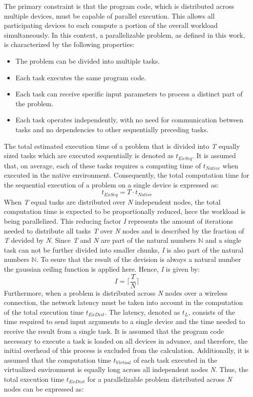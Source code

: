 The primary constraint is that the program code, which is distributed across multiple devices, must be capable of parallel execution. This allows all participating devices to  each compute a portion of the overall workload simultaneously. In this context, a parallelizable problem, as defined in this work, is characterized by the following properties:
\begin{itemize}
  \item The problem can be divided into multiple tasks.
  \item Each task executes the same program code.
  \item Each task can receive specific input parameters to process a distinct part of the problem.
  \item Each task operates independently, with no need for communication between tasks and no dependencies to other sequentially preceding tasks.
\end{itemize}
The total estimated execution time of a problem that is divided into \emph{T} equally sized tasks which are executed sequentially is denoted as $t_{ExSeq}$. It is assumed that, on average, each of these tasks requires a computing time of $t_{Native}$ when executed in the native environment. Consequently, the total computation time for the sequential execution of a problem on a single device is expressed as:
\begin{equation}
  t_{ExSeq} = T \cdot t_{Native}
  \label{equ:single}
\end{equation}
When \emph{T} equal tasks are distributed over \emph{N} independent nodes, the total computation time is expected to be proportionally reduced, hece the workload is being parallelized. This reducing factor \emph{I} represents the amount of iterations needed to distribute all tasks \emph{T} over \emph{N} nodes and is described by the fraction of \emph{T} devided by \emph{N}. Since \emph{T} and \emph{N} are part of the natural numbers $\mathbb{N}$ and a single task can not be further divided into smaller chunks, \emph{I} is also part of the natural numbers $\mathbb{N}$. To esure that the result of the devision is always a natural number the gaussian ceiling function is applied here. Hence, \emph{I} is given by: 
\begin{equation}
  I = \bigg\lceil\frac{T}{N}\bigg\rceil
  \label{equ:frac}
\end{equation}
Furthermore, when a problem is distributed across \emph{N} nodes over a wireless connection, the network latency must be taken into account in the computation of the total execution time $t_{ExDist}$. The latency, denoted as $t_{L}$, consists of the time required to send input arguments to a single device and the time needed to receive the result from a single task. It is assumed that the program code necessary to execute a task is loaded on all devices in advance, and therefore, the initial overhead of this process is excluded from the calculation. Additionally, it is assumed that the computation time $t_{Virtual}$ of each task executed in the virtualized environment is equally long across all independent nodes \emph{N}. Thus, the total execution time $t_{ExDist}$ for a parallelizable problem distributed across \emph{N} nodes can be expressed as:
